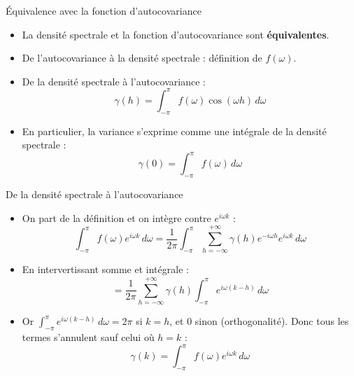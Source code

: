 \documentclass[11pt,aspectratio=169]{beamer}
\begin{document}
\begin{frame}{Équivalence avec la fonction d'autocovariance}

\begin{itemize}

\item La densité spectrale et la fonction d'autocovariance sont \textbf{équivalentes}.\newline

\item De l'autocovariance à la densité spectrale : définition de $f(\omega)$.\newline

\item De la densité spectrale à l'autocovariance :
  \[
  \gamma(h) = \int_{-\pi}^{\pi} f(\omega) \cos(\omega h) \, d\omega
  \]\newline

\item En particulier, la variance s'exprime comme une intégrale de la densité spectrale :
  \[
  \gamma(0) = \int_{-\pi}^{\pi} f(\omega) \, d\omega
  \]

\end{itemize}

\end{frame}

\begin{frame}{De la densité spectrale à l'autocovariance}

\begin{itemize}

\item On part de la définition et on intègre contre $e^{i\omega k}$ :
  \[
  \int_{-\pi}^{\pi} f(\omega) e^{i\omega k} \, d\omega = \frac{1}{2\pi} \int_{-\pi}^{\pi} \sum_{h=-\infty}^{+\infty} \gamma(h) e^{-i\omega h} e^{i\omega k} \, d\omega
  \]\newline

\item En intervertissant somme et intégrale :
  \[
  = \frac{1}{2\pi} \sum_{h=-\infty}^{+\infty} \gamma(h) \int_{-\pi}^{\pi} e^{i\omega (k-h)} \, d\omega
  \]\newline

\item Or $\int_{-\pi}^{\pi} e^{i\omega (k-h)} \, d\omega = 2\pi$ si $k = h$, et $0$ sinon (orthogonalité). Donc tous les termes s'annulent sauf celui où $h = k$ :
  \[
  \boxed{\gamma(k) = \int_{-\pi}^{\pi} f(\omega) e^{i\omega k} \, d\omega}
  \]

\end{itemize}

\end{frame}
\end{document}
